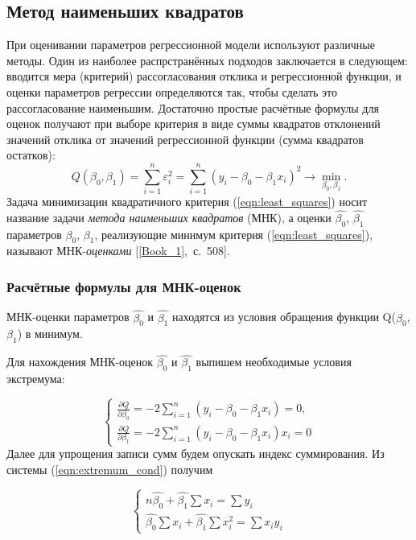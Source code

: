 \documentclass[12pt,a4paper]{article}
\begin{document}
	\subsection{Метод наименьших квадратов}
		При оценивании параметров регрессионной модели используют различные методы. Один из наиболее распрстранённых подходов заключается в следующем: вводится мера (критерий) рассогласования отклика и регрессионной функции, и оценки параметров регрессии определяются так, чтобы сделать это рассогласование наименьшим. Достаточно простые расчётные формулы для оценок получают при выборе критерия в виде суммы квадратов отклонений значений отклика от значений регрессионной функции (сумма квадратов остатков):
		\begin{equation}\label{eqn:least_squares}
		Q(\beta_0, \beta_1) = \sum_{i = 1}^{n} \varepsilon^2_i = \sum_{i = 1}^{n} (y_i - \beta_0 - \beta_1 x_i)^2 \rightarrow \min_{\beta_0, \beta_1}.
		\end{equation}
		Задача минимизации квадратичного критерия (\ref{eqn:least_squares}) носит название задачи \emph{метода наименьших квадратов} (МНК), а оценки $\hat{\beta_0}$, $\hat{\beta_1}$ параметров $\beta_0$, $\beta_1$, реализующие минимум критерия (\ref{eqn:least_squares}), называют МНК-\emph{оценками} [\ref{Book_1},~с.~508].
		
		\subsubsection{Расчётные формулы для МНК-оценок}
			МНК-оценки параметров $\hat{\beta_0}$ и $\hat{\beta_1}$ находятся из условия обращения функции Q($\beta_0$, $\beta_1$) в минимум.
		
			Для нахождения МНК-оценок $\hat{\beta_0}$ и $\hat{\beta_1}$ выпишем необходимые условия экстремума:
		
			\begin{equation}\label{eqn:extremum_cond}
			\begin{cases}
			\frac{\partial Q}{\partial \beta_0} = -2 \sum_{i = 1}^{n} (y_i - \beta_0 - \beta_1 x_i) = 0,\\
			\frac{\partial Q}{\partial \beta_1} = -2 \sum_{i = 1}^{n} (y_i - \beta_0 - \beta_1 x_i)x_i = 0
			\end{cases}
			\end{equation}
			Далее для упрощения записи сумм будем опускать индекс суммирования. Из системы (\ref{eqn:extremum_cond}) получим
			
			\begin{equation}\label{eqn:extremum_cond_2}
			\begin{cases}
			n\hat{\beta_0} + \hat{\beta_1} \sum x_i = \sum y_i\\
			\hat{\beta_0}\sum x_i + \hat{\beta_1} \sum x^2_i = \sum x_i y_i
			\end{cases}
			\end{equation}
				
\end{document}

